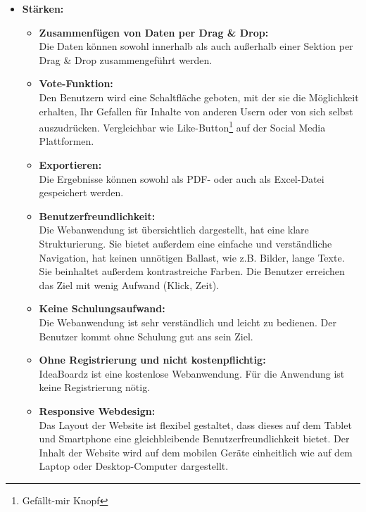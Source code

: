 \begin{itemize}
\item \textbf{Stärken:}
\begin{itemize}
\item \textbf{Zusammenfügen von Daten per Drag \& Drop:}\\
Die Daten können sowohl innerhalb als auch außerhalb einer Sektion per Drag \& Drop zusammengeführt werden.
\item \textbf{Vote-Funktion:}\\
Den Benutzern wird eine Schaltfläche geboten, mit der sie die Möglichkeit erhalten, Ihr Gefallen für Inhalte von anderen Usern oder von sich selbst auszudrücken. Vergleichbar wie Like-Button\footnote{Gefällt-mir Knopf} auf der Social Media Plattformen.
\item \textbf{Exportieren:}\\
Die Ergebnisse können sowohl als PDF- oder auch als Excel-Datei gespeichert werden.
\item \textbf{Benutzerfreundlichkeit:}\\
Die Webanwendung ist übersichtlich dargestellt, hat eine klare Strukturierung. Sie bietet außerdem eine einfache und verständliche Navigation, hat keinen unnötigen Ballast, wie z.B. Bilder, lange Texte. Sie beinhaltet außerdem kontrastreiche Farben. Die Benutzer erreichen das Ziel mit wenig Aufwand (Klick, Zeit).
\item \textbf{Keine Schulungsaufwand:}\\
Die Webanwendung ist sehr verständlich und leicht zu bedienen. Der Benutzer kommt ohne Schulung gut ans sein Ziel.
\item \textbf{Ohne Registrierung und nicht kostenpflichtig:}\\
IdeaBoardz ist eine kostenlose Webanwendung. Für die Anwendung ist keine Registrierung nötig.
\item \textbf{Responsive Webdesign:}\\
Das Layout der Website ist flexibel gestaltet, dass dieses auf dem Tablet und Smartphone eine gleichbleibende Benutzerfreundlichkeit bietet. 
Der Inhalt der Website wird auf dem mobilen Geräte einheitlich wie auf dem Laptop oder Desktop-Computer dargestellt.
\end{itemize}
\end{itemize}

